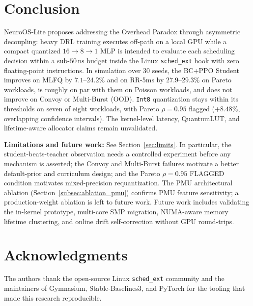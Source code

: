 \section{Conclusion}
\label{sec:conclusion}

NeuroOS-Lite proposes addressing the Overhead Paradox through asymmetric
decoupling: heavy DRL training executes off-path on a local GPU while a compact
quantized $16\to 8\to 1$ MLP is intended to evaluate each scheduling decision
within a sub-$50\,\text{ns}$ budget inside the Linux \texttt{sched\_ext} hook
with zero floating-point instructions. In simulation over 30 seeds, the BC+PPO
Student improves on MLFQ by $7.1\text{--}24.2\%$ and on RR-5ms by
$27.9\text{--}29.3\%$ on Pareto workloads, is roughly on par with them on
Poisson workloads, and does not improve on Convoy or Multi-Burst (OOD).
\texttt{Int8} quantization stays within its thresholds on seven of eight
workloads, with Pareto $\rho = 0.95$ flagged ($+8.48\%$, overlapping
confidence intervals). The kernel-level latency, QuantumLUT, and
lifetime-aware allocator claims remain unvalidated.

\textbf{Limitations and future work:}
See Section~\ref{sec:limits}. In particular, the student-beats-teacher
observation needs a controlled experiment before any mechanism is asserted; the
Convoy and Multi-Burst failures motivate a better default-prior and curriculum
design; and the Pareto $\rho = 0.95$ FLAGGED condition motivates mixed-precision
requantization. The PMU architectural ablation (Section~\ref{subsec:ablation_pmu})
confirms PMU feature sensitivity; a production-weight ablation is left to future work.
Future work includes validating the in-kernel prototype, multi-core SMP
migration, NUMA-aware memory lifetime clustering, and online drift
self-correction without GPU round-trips.

\section*{Acknowledgments}
The authors thank the open-source Linux \texttt{sched\_ext} community and the
maintainers of Gymnasium, Stable-Baselines3, and PyTorch for the tooling that
made this research reproducible.





